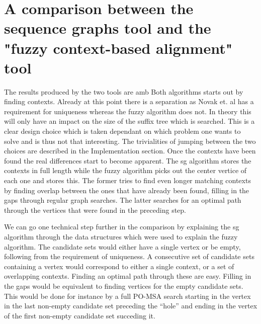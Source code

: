 \documentclass[thesis.tex]{subfiles}
\begin{document}
\section{A comparison between the sequence graphs tool and the "fuzzy context-based alignment" tool}
The results produced by the two tools are amb
Both algorithms starts out by finding contexts. Already at this point there is a separation as Novak et. al has a requirement for uniqueness whereas the fuzzy algorithm does not. In theory this will only have an impact on the size of the suffix tree which is searched. This is a clear design choice which is taken dependant on which problem one wants to solve and is thus not that interesting. The trivialities of jumping between the two choices are described in the Implementation section. Once the contexts have been found the real differences start to become apparent. The sg algorithm stores the contexts in full length  while the fuzzy algorithm picks out the center vertice of each one and stores this. The former tries to find even longer matching contexts by finding overlap between the ones that have already been found, filling in the gaps through regular graph searches. The latter searches for an optimal path through the vertices that were found in the preceding step.\\
\par\noindent
We can go one technical step further in the comparison by explaining the sg algorithm through the data structures which were used to explain the fuzzy algorithm. The candidate sets would either have a single vertex or be empty, following from the requirement of uniqueness.  A consecutive set of candidate sets containing a vertex would correspond to either a single context, or a set of overlapping contexts. Finding an optimal path through these are easy. Filling in the gaps would be equivalent to finding vertices for the empty candidate sets. This would be done for instance by a full PO-MSA search starting in the vertex in the last non-empty candidate set preceding the ``hole'' and ending in the vertex of the first non-empty candidate set succeding it.\\
\par\noindent
\end{document}
